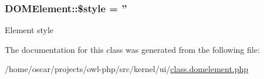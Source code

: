 \subsubsection[{\$style}]{\setlength{\rightskip}{0pt plus 5cm}DOMElement::\$style = ''}\label{classDOMElement_aa678fb06bb8ffd915c7e6ded8cfc58b6}
Element style 

The documentation for this class was generated from the following file:\begin{DoxyCompactItemize}
\item 
/home/oscar/projects/owl-\/php/src/kernel/ui/\hyperlink{class_8domelement_8php}{class.domelement.php}\end{DoxyCompactItemize}
